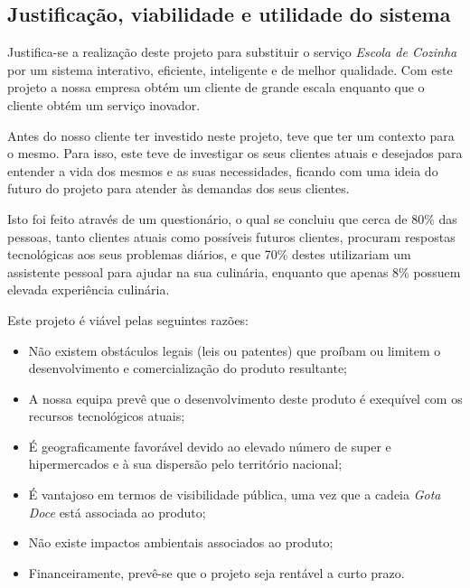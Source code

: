 
\subsection{Justificação, viabilidade e utilidade do sistema}
\label{cap:fundamentacao:justificacao}

Justifica-se a realização deste projeto para substituir o serviço \emph{Escola de Cozinha} por um sistema interativo, eficiente, inteligente e de melhor qualidade. Com este projeto a nossa empresa obtém um cliente de grande escala enquanto que o cliente obtém um serviço inovador.

Antes do nosso cliente ter investido neste projeto, teve que ter um contexto para o mesmo. Para isso, este teve de investigar os seus clientes atuais e desejados para entender a vida dos mesmos e as suas necessidades, ficando com uma ideia do futuro do projeto para atender às demandas dos seus clientes.

Isto foi feito através de um questionário, o qual se concluiu que cerca de 80\% das pessoas, tanto clientes atuais como possíveis futuros clientes, procuram respostas tecnológicas aos seus problemas diários, e que 70\% destes utilizariam um assistente pessoal para ajudar na sua culinária, enquanto que apenas 8\% possuem elevada experiência culinária. 

Este projeto é viável pelas seguintes razões:

\begin{itemize}

    \item Não existem obstáculos legais (leis ou patentes) que proíbam ou limitem o desenvolvimento e comercialização do produto resultante;
    
    \item A nossa equipa prevê que o desenvolvimento deste produto é exequível com os recursos tecnológicos atuais;
    
    \item É geograficamente favorável devido ao elevado número de super e hipermercados e à sua dispersão pelo território nacional;
    
    \item É vantajoso em termos de visibilidade pública, uma vez que a cadeia \emph{Gota Doce} está associada ao produto;
    
    \item Não existe impactos ambientais associados ao produto;
    
    \item Financeiramente, prevê-se que o projeto seja rentável a curto prazo.
    
\end{itemize}

